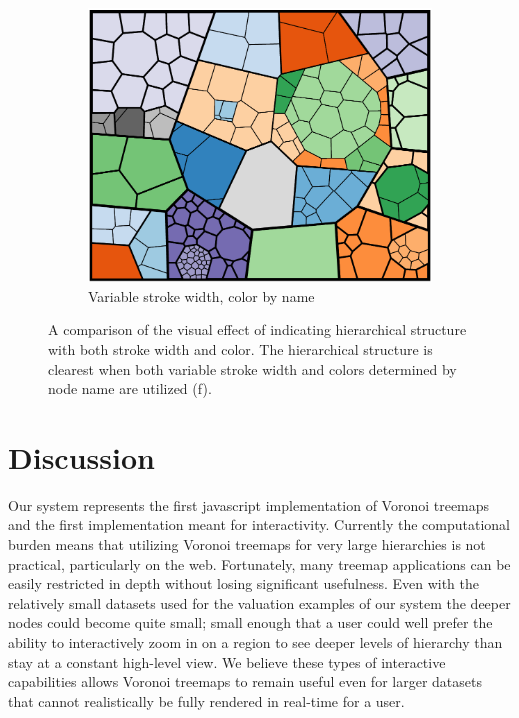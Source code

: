\documentclass{acm_proc_article-sp} \usepackage{cite}
\begin{document}
\begin{figure}
        \begin{subfigure}[b]{\comparelength}
                \includegraphics[width=\textwidth]{source-images/compare-stroke-name-cropped.PNG}
                \caption{Variable stroke width, color by name}
        \end{subfigure}
\caption{A comparison of the visual effect of indicating hierarchical structure with both stroke width and color.
The hierarchical structure is clearest when both variable stroke width and colors determined by node name are utilized (f).}
\label{fig:comparestrokecolor}
\end{figure}



\section{Discussion}
\label{sec:discussion}
Our system represents the first javascript implementation of Voronoi
treemaps and the first implementation meant for interactivity.
Currently the computational burden means that utilizing Voronoi
treemaps for very large hierarchies is not practical, particularly on
the web. Fortunately, many treemap applications can be easily
restricted in depth without losing significant usefulness. Even with
the relatively small datasets used for the valuation examples of our
system the deeper nodes could become quite small; small enough that a
user could well prefer the ability to interactively zoom in on a
region to see deeper levels of hierarchy than stay at a constant
high-level view. We believe these types of interactive capabilities
allows Voronoi treemaps to remain useful even for larger datasets that
cannot realistically be fully rendered in real-time for a user.
\end{document}
